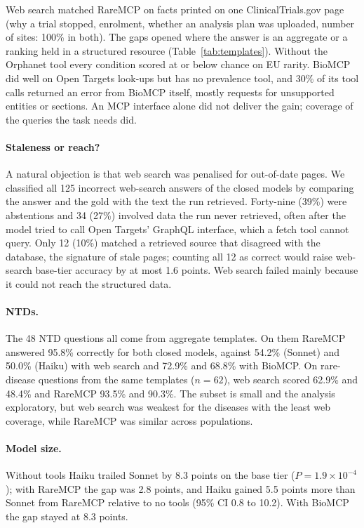 \documentclass[11pt]{article}
\begin{document}
Web search matched RareMCP on facts printed on one ClinicalTrials.gov page (why a trial stopped, enrolment, whether an analysis plan was uploaded, number of sites: 100\% in both). The gaps opened where the answer is an aggregate or a ranking held in a structured resource (Table~\ref{tab:templates}). Without the Orphanet tool every condition scored at or below chance on EU rarity. BioMCP did well on Open Targets look-ups but has no prevalence tool, and 30\% of its tool calls returned an error from BioMCP itself, mostly requests for unsupported entities or sections. An MCP interface alone did not deliver the gain; coverage of the queries the task needs did.

\paragraph{Staleness or reach?} A natural objection is that web search was penalised for out-of-date pages. We classified all 125 incorrect web-search answers of the closed models by comparing the answer and the gold with the text the run retrieved. Forty-nine (39\%) were abstentions and 34 (27\%) involved data the run never retrieved, often after the model tried to call Open Targets' GraphQL interface, which a fetch tool cannot query. Only 12 (10\%) matched a retrieved source that disagreed with the database, the signature of stale pages; counting all 12 as correct would raise web-search base-tier accuracy by at most 1.6 points. Web search failed mainly because it could not reach the structured data.

\paragraph{NTDs.} The 48 NTD questions all come from aggregate templates. On them RareMCP answered 95.8\% correctly for both closed models, against 54.2\% (Sonnet) and 50.0\% (Haiku) with web search and 72.9\% and 68.8\% with BioMCP. On rare-disease questions from the same templates ($n=62$), web search scored 62.9\% and 48.4\% and RareMCP 93.5\% and 90.3\%. The subset is small and the analysis exploratory, but web search was weakest for the diseases with the least web coverage, while RareMCP was similar across populations.

\paragraph{Model size.} Without tools Haiku trailed Sonnet by 8.3 points on the base tier ($P=1.9\times10^{-4}$); with RareMCP the gap was 2.8 points, and Haiku gained 5.5 points more than Sonnet from RareMCP relative to no tools (95\% CI 0.8 to 10.2). With BioMCP the gap stayed at 8.3 points.
\end{document}
